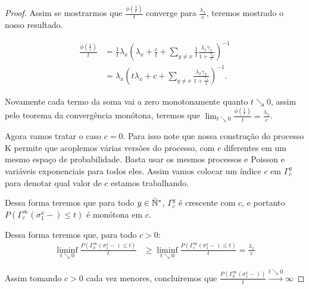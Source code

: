 \begin{proof}
  Assim se mostrarmos que $\frac{\phi(\frac{1}{t})}{t}$ converge para
  $\frac{\lambda_x}{c}$, teremos mostrado o nosso resultado.

  \begin{align*}
    \frac{\phi(\frac{1}{t})}{t} &= \frac{1}{t} \lambda_x \left(
      \lambda_x + \frac{c}{t} + \sum_{y \neq x} \frac{1}{t}
      \frac{\lambda_x \gamma_x}{1 + \frac{\gamma_x}{t}} \right)^{-1} \\
    &= \lambda_x \left( t\lambda_x + c + \sum_{y \neq x}
      \frac{\lambda_x \gamma_x}{1 + \frac{\gamma_x}{t}} \right)^{-1}.
  \end{align*}

  Novamente cada termo da soma vai a zero monotonamente quanto $t
  \searrow 0$, assim pelo teorema da convergência monótona, teremos que
  $\lim_{t \searrow 0} \frac{\phi(\frac{1}{t})}{t} =
  \frac{\lambda_x}{c}$.

  Agora vamos tratar o caso $c = 0$. Para isso note que nossa
  construção do processo K permite que acoplemos várias versões do
  processo, com $c$ diferentes em um mesmo espaço de
  probabilidade. Basta usar os mesmos processos e Poisson e variáveis
  exponenciais para todos eles. Assim vamos colocar um índice $c$ em
  $\Gamma^y_c$ para denotar qual valor de $c$ estamos trabalhando.

  Dessa forma teremos que para todo $y \in {\mathbb{\bar{N}^*}}$, $\Gamma^y_c$ é
  crescente com $c$, e portanto $P ( \Gamma^\infty_c(\sigma^x_1-) \leq
  t)$ é monótona em $c$.

  Dessa forma teremos que, para todo $c > 0$:
  \begin{align*}
    \liminf_{t \searrow 0} \frac{P ( \Gamma^\infty_0(\sigma^x_1-) \leq
      t)}{t} &\geq \liminf_{t \searrow 0} \frac{P (
      \Gamma^\infty_c(\sigma^x_1-) \leq t)}{t}
    = \frac{\lambda_x}{c}
  \end{align*}

  Assim tomando $c > 0$ cada vez menores, concluiremos que $\frac{P (
    \Gamma^\infty_0(\sigma^x_1-))}{t} \xrightarrow{t \searrow 0}
  \infty$
\end{proof}

